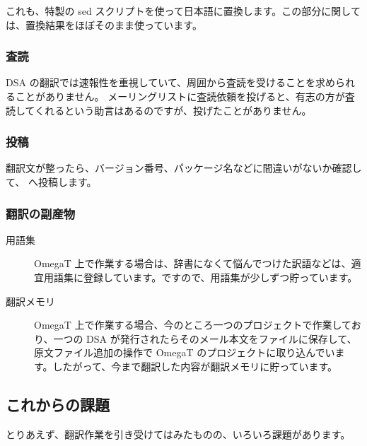 \documentclass[mingoth,a4paper]{jsarticle}
\begin{document}
\vspace{1ex}\par

これも、特製の sed スクリプトを使って日本語に置換します。この部分に関しては、置換結果をほぼそのまま使っています。

\subsubsection{査読}

DSA の翻訳では速報性を重視していて、周囲から査読を受けることを求められることがありません。
 メーリングリストに査読依頼を投げると、有志の方が査読してくれるという助言はあるのですが、投げたことがありません。

\subsubsection{投稿}

翻訳文が整ったら、バージョン番号、パッケージ名などに間違いがないか確認して、  へ投稿します。


\subsubsection{翻訳の副産物}

\begin{description}
\item[用語集] OmegaT 上で作業する場合は、辞書になくて悩んでつけた訳語などは、適宜用語集に登録しています。ですので、用語集が少しずつ貯っています。
\item[翻訳メモリ] OmegaT 上で作業する場合、今のところ一つのプロジェクトで作業しており、一つの DSA が発行されたらそのメール本文をファイルに保存して、原文ファイル追加の操作で OmegaT のプロジェクトに取り込んでいます。したがって、今まで翻訳した内容が翻訳メモリに貯っています。
\end{description}


\subsection{これからの課題}

とりあえず、翻訳作業を引き受けてはみたものの、いろいろ課題があります。
\end{document}
